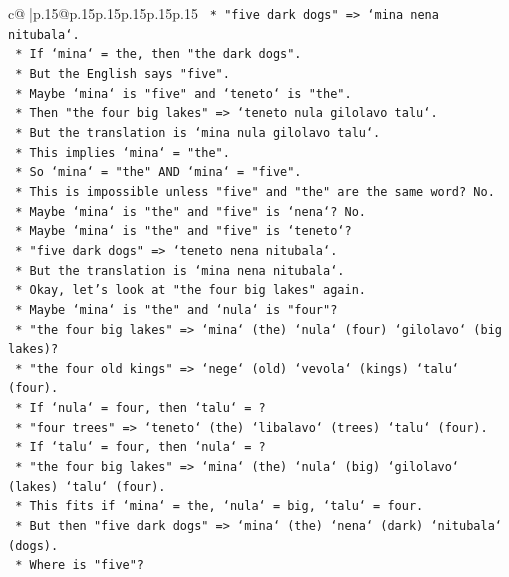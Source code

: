 \documentclass{article}
\begin{document}
{\begin{supertabular}{c@{$\;$}|p{.15\linewidth}@{}p{.15\linewidth}p{.15\linewidth}p{.15\linewidth}p{.15\linewidth}p{.15\linewidth}}
{{{\texttt{    *   "five dark dogs" => `mina nena nitubala`.} \\
\texttt{    *   If `mina` = the, then "the dark dogs".} \\
\texttt{    *   But the English says "five".} \\
\texttt{    *   Maybe `mina` is "five" and `teneto` is "the".} \\
\texttt{    *   Then "the four big lakes" => `teneto nula gilolavo talu`.} \\
\texttt{    *   But the translation is `mina nula gilolavo talu`.} \\
\texttt{    *   This implies `mina` = "the".} \\
\texttt{    *   So `mina` = "the" AND `mina` = "five".} \\
\texttt{    *   This is impossible unless "five" and "the" are the same word? No.} \\
\texttt{    *   Maybe `mina` is "the" and "five" is `nena`? No.} \\
\texttt{    *   Maybe `mina` is "the" and "five" is `teneto`?} \\
\texttt{    *   "five dark dogs" => `teneto nena nitubala`.} \\
\texttt{    *   But the translation is `mina nena nitubala`.} \\
\texttt{    *   Okay, let's look at "the four big lakes" again.} \\
\texttt{    *   Maybe `mina` is "the" and `nula` is "four"?} \\
\texttt{    *   "the four big lakes" => `mina` (the) `nula` (four) `gilolavo` (big lakes)?} \\
\texttt{    *   "the four old kings" => `nege` (old) `vevola` (kings) `talu` (four).} \\
\texttt{    *   If `nula` = four, then `talu` = ?} \\
\texttt{    *   "four trees" => `teneto` (the) `libalavo` (trees) `talu` (four).} \\
\texttt{    *   If `talu` = four, then `nula` = ?} \\
\texttt{    *   "the four big lakes" => `mina` (the) `nula` (big) `gilolavo` (lakes) `talu` (four).} \\
\texttt{    *   This fits if `mina` = the, `nula` = big, `talu` = four.} \\
\texttt{    *   But then "five dark dogs" => `mina` (the) `nena` (dark) `nitubala` (dogs).} \\
\texttt{    *   Where is "five"?} \\
}}}
\end{supertabular}}
\end{document}
